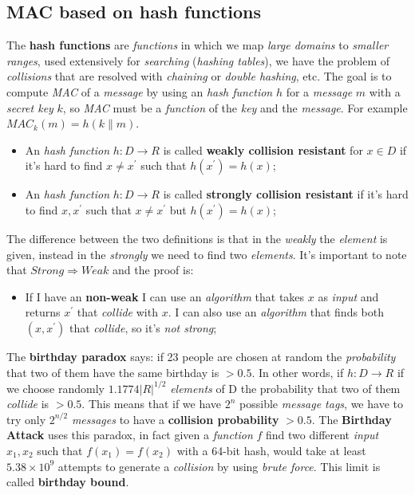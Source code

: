 \documentclass{article}
\begin{document}
\subsection{MAC based on hash functions}
The \textbf{hash functions} are \emph{functions} in which we map \emph{large domains} to \emph{smaller ranges}, used extensively for \emph{searching} (\emph{hashing tables}), we have the problem of \emph{collisions} that are resolved with \emph{chaining} or \emph{double hashing}, etc. The goal is to compute \emph{MAC} of a \emph{message} by using an \emph{hash function} $h$ for a \emph{message} $m$ with a \emph{secret key} $k$, so \emph{MAC} must be a \emph{function} of the \emph{key} and the \emph{message}. For example $MAC_k(m) = h(k \parallel m)$. 
\begin{itemize}
\item An \emph{hash function} $h: D \rightarrow R$ is called \textbf{weakly collision resistant} for $x \in D$ if it's hard to find $x \neq x^{'}$ such that $h(x^{'}) = h(x)$;
\item An \emph{hash function} $h: D \rightarrow R$ is called \textbf{strongly collision resistant} if it's hard to find $x, x^{'}$ such that $x \neq x^{'}$ but $h(x^{'}) = h(x)$;
\end{itemize}
The difference between the two definitions is that in the \emph{weakly} the \emph{element} is given, instead in the \emph{strongly} we need to find two \emph{elements}. It's important to note that $Strong \Rightarrow Weak$ and the proof is:
\begin{itemize}
\item If I have an \textbf{non-weak} I can use an \emph{algorithm} that takes $x$ as \emph{input} and returns $x^{'}$ that \emph{collide} with $x$. I can also use an \emph{algorithm} that finds both $(x,x^{'})$ that \emph{collide}, so it's \emph{not strong};
\end{itemize}
The \textbf{birthday paradox} says: if 23 people are chosen at random the \emph{probability} that two of them have the same birthday is $>0.5$. In other words, if $h: D \rightarrow R$ if we choose randomly $1.1774|R|^{1/2}$ \emph{elements} of D the probability that two of them \emph{collide} is $>0.5$. This means that if we have $2^n$ possible \emph{message tags}, we have to try only $2^{n/2}$ \emph{messages} to have a\textbf{ collision probability} $>0.5$. The \textbf{Birthday Attack} uses this paradox, in fact given a \emph{function} $f$ find two different \emph{input} $x_1, x_2$ such that $f(x_1) = f(x_2)$ with a 64-bit hash, would take at least $5.38\times 10^9$ attempts to generate a \emph{collision} by using \emph{brute force}. This limit is called \textbf{birthday bound}.\\\\
\end{document}
